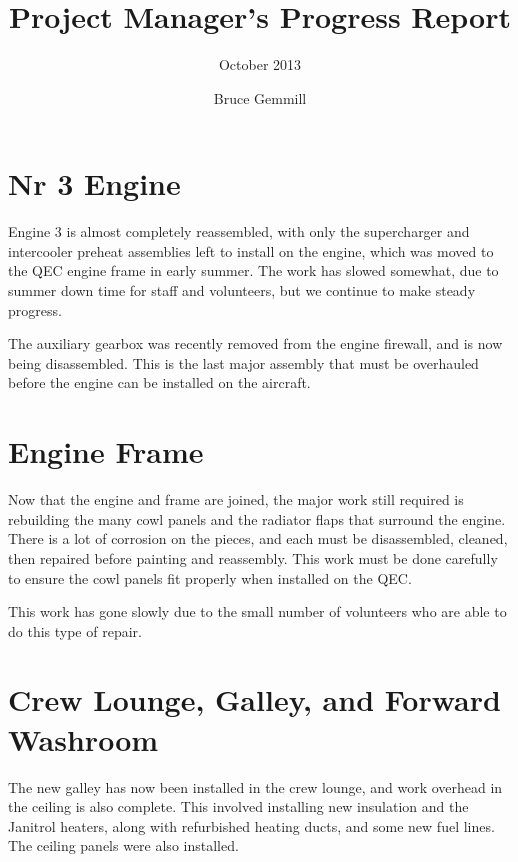 %


\title{Project Manager's Progress Report}
\subtitle{October 2013}
\author{Bruce Gemmill}

\maketitle

\section{Nr 3 Engine}
\label{sec:engines_3}

Engine 3 is almost completely reassembled, with only the supercharger
and intercooler preheat assemblies left to install on the engine,
which was moved to the QEC engine frame in early summer.  The work has
slowed somewhat, due to summer down time for staff and volunteers, but
we continue to make steady progress.

The auxiliary gearbox was recently removed from the engine firewall,
and is now being disassembled.  This is the last major assembly that
must be overhauled before the engine can be installed on the aircraft.

\section{Engine Frame}
\label{engineframe}

Now that the engine and frame are joined, the major work still
required is rebuilding the many cowl panels and the radiator flaps
that surround the engine.  There is a lot of corrosion on the pieces,
and each must be disassembled, cleaned, then repaired before painting
and reassembly.  This work must be done carefully to ensure the cowl
panels fit properly when installed on the QEC.

This work has gone slowly due to the small number of volunteers who
are able to do this type of repair.


\section{Crew Lounge, Galley,  and Forward Washroom}
\label{crewlounge}

The new galley has now been installed in the crew lounge, and work
overhead in the ceiling is also complete.  This involved installing
new insulation and the Janitrol heaters, along with refurbished
heating ducts, and some new fuel lines.  The ceiling panels were also
installed.

